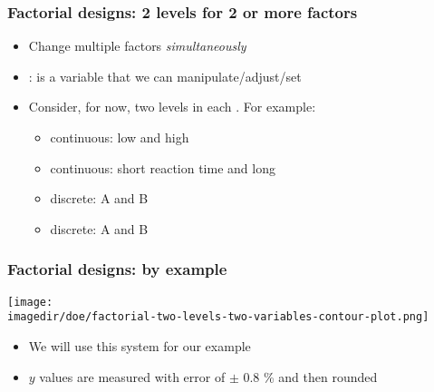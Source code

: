 \begin{frame}\frametitle{Factorial designs: 2 levels for 2 or more factors}
	\begin{itemize}
		\item	Change multiple factors \emph{simultaneously}
		\item	{\color{purple}{Factor}}: is a variable that we can manipulate/adjust/set
		\item	Consider, for now, two levels in each \textbf{{\color{myOrange}{factor}}}. For example:
		\begin{itemize}
			
			\item	continuous: low and high {\color{myOrange}{pH}}
			\item	continuous: short reaction time and long {\color{myOrange}{reaction time}}
			\item	discrete: {\color{myOrange}{catalyst}} A and B
			\item	discrete: {\color{myOrange}{mixing system}} A and B
		\end{itemize}
	\end{itemize}
\end{frame}

\begin{frame}\frametitle{Factorial designs: by example}
	\begin{center}
		\texttt{[image: \\imagedir/doe/factorial-two-levels-two-variables-contour-plot.png]}
	\end{center}
	\begin{itemize}
		\item	We will use this system for our example
		\item	$y$ values are measured with error of $\pm$ 0.8 \% and then rounded
	\end{itemize}
\end{frame}

